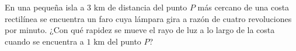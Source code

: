 \item En una pequeña isla a $3 \text{ km}$ de distancia del punto $P$ más cercano de una costa rectilínea se encuentra un faro cuya lámpara gira a razón de cuatro revoluciones por minuto. ¿Con qué rapidez se mueve el rayo de luz a lo largo de la costa cuando se encuentra a $1 \text{ km}$ del punto $P$?
